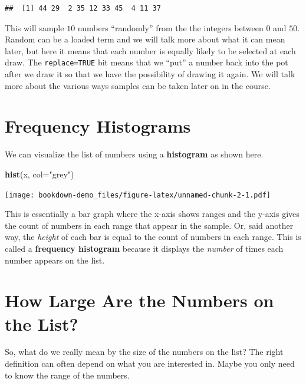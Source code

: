 \documentclass[]{book}
\newenvironment{Shaded}{\begin{snugshade}}{\end{snugshade}}
\newcommand{\DataTypeTok}[1]{\textcolor[rgb]{0.13,0.29,0.53}{#1}}
\newcommand{\KeywordTok}[1]{\textcolor[rgb]{0.13,0.29,0.53}{\textbf{#1}}}
\newcommand{\NormalTok}[1]{#1}
\newcommand{\StringTok}[1]{\textcolor[rgb]{0.31,0.60,0.02}{#1}}
\begin{document}
\begin{verbatim}
##  [1] 44 29  2 35 12 33 45  4 11 37
\end{verbatim}

This will sample \(10\) numbers ``randomly'' from the the integers between \(0\) and \(50\). Random can be a loaded term and we will talk more about what it can mean later, but here it means that each number is equally likely to be selected at each draw. The \texttt{replace=TRUE} bit means that we ``put'' a number back into the pot after we draw it so that we have the possibility of drawing it again. We will talk more about the various ways samples can be taken later on in the course.

\hypertarget{frequency-histograms}{%
\section{Frequency Histograms}\label{frequency-histograms}}

We can visualize the list of numbers using a \textbf{histogram} as shown here.

\begin{Shaded}
\begin{Highlighting}[]
\KeywordTok{hist}\NormalTok{(x, }\DataTypeTok{col=}\StringTok{"grey"}\NormalTok{)}
\end{Highlighting}
\end{Shaded}

\texttt{[image: bookdown-demo\_files/figure-latex/unnamed-chunk-2-1.pdf]}

This is essentially a bar graph where the x-axis shows ranges and the y-axis gives the count of numbers in each range that appear in the sample. Or, said another way, the \emph{height} of each bar is equal to the count of numbers in each range. This is called a \textbf{frequency histogram} because it displays the \emph{number} of times each number appears on the list.

\hypertarget{how-large-are-the-numbers-on-the-list}{%
\section{How Large Are the Numbers on the List?}\label{how-large-are-the-numbers-on-the-list}}

So, what do we really mean by the size of the numbers on the list? The right definition can often depend on what you are interested in. Maybe you only need to know the range of the numbers.
\end{document}

